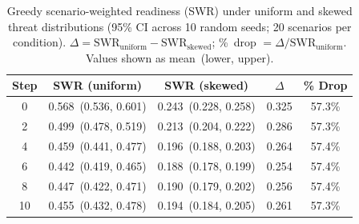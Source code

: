 \begin{table}[htbp]
\centering
\caption{Greedy scenario-weighted readiness (SWR) under uniform and skewed threat distributions (95\% CI across 10 random seeds; 20 scenarios per condition). $\Delta = \text{SWR}_{\text{uniform}} - \text{SWR}_{\text{skewed}}$; \%~drop $= \Delta / \text{SWR}_{\text{uniform}}$. Values shown as mean~(lower, upper).}
\label{tab:exp1_sensitivity}
\begin{tabular}{ccccc}
\hline
Step & SWR (uniform) & SWR (skewed) & $\Delta$ & \% Drop \\
\hline
         0 & 0.568~(0.536, 0.601) & 0.243~(0.228, 0.258) & 0.325 & 57.3\% \\
         2 & 0.499~(0.478, 0.519) & 0.213~(0.204, 0.222) & 0.286 & 57.3\% \\
         4 & 0.459~(0.441, 0.477) & 0.196~(0.188, 0.203) & 0.264 & 57.4\% \\
         6 & 0.442~(0.419, 0.465) & 0.188~(0.178, 0.199) & 0.254 & 57.4\% \\
         8 & 0.447~(0.422, 0.471) & 0.190~(0.179, 0.202) & 0.256 & 57.4\% \\
        10 & 0.455~(0.432, 0.478) & 0.194~(0.184, 0.205) & 0.261 & 57.3\% \\
\hline
\end{tabular}
\end{table}